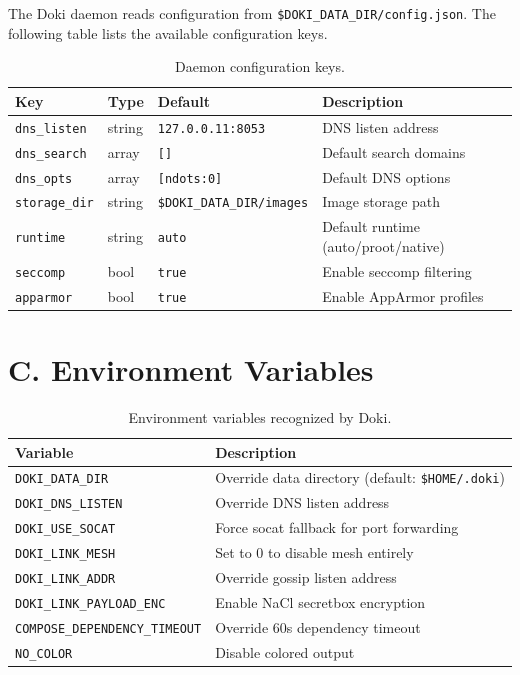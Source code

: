 The Doki daemon reads configuration from
\texttt{\$DOKI\_DATA\_DIR/config.json}. The following table lists the
available configuration keys.

\begin{table}[htbp]
  \centering
  \caption{Daemon configuration keys.}
  \label{tab:config-keys}
  \begin{tabularx}{\textwidth}{l l l X}
    \toprule
    \textbf{Key} & \textbf{Type} & \textbf{Default} & \textbf{Description} \\
    \midrule
    \texttt{dns\_listen}   & string & \texttt{127.0.0.11:8053} & DNS listen address \\
    \texttt{dns\_search}   & array  & \texttt{[]} & Default search domains \\
    \texttt{dns\_opts}     & array  & \texttt{[ndots:0]} & Default DNS options \\
    \texttt{storage\_dir}  & string & \texttt{\$DOKI\_DATA\_DIR/images} & Image storage path \\
    \texttt{runtime}       & string & \texttt{auto} & Default runtime (auto/proot/native) \\
    \texttt{seccomp}       & bool   & \texttt{true} & Enable seccomp filtering \\
    \texttt{apparmor}      & bool   & \texttt{true} & Enable AppArmor profiles \\
    \bottomrule
  \end{tabularx}
\end{table}

\section{C. Environment Variables}
\label{sec:env-vars}

\begin{table}[htbp]
  \centering
  \caption{Environment variables recognized by Doki.}
  \label{tab:env-vars}
  \begin{tabularx}{\textwidth}{l X}
    \toprule
    \textbf{Variable} & \textbf{Description} \\
    \midrule
    \texttt{DOKI\_DATA\_DIR}    & Override data directory (default: \texttt{\$HOME/.doki}) \\
    \texttt{DOKI\_DNS\_LISTEN}  & Override DNS listen address \\
    \texttt{DOKI\_USE\_SOCAT}   & Force socat fallback for port forwarding \\
    \texttt{DOKI\_LINK\_MESH}   & Set to 0 to disable mesh entirely \\
    \texttt{DOKI\_LINK\_ADDR}   & Override gossip listen address \\
    \texttt{DOKI\_LINK\_PAYLOAD\_ENC} & Enable NaCl secretbox encryption \\
    \texttt{COMPOSE\_DEPENDENCY\_TIMEOUT} & Override 60s dependency timeout \\
    \texttt{NO\_COLOR}          & Disable colored output \\
    \bottomrule
  \end{tabularx}
\end{table}

